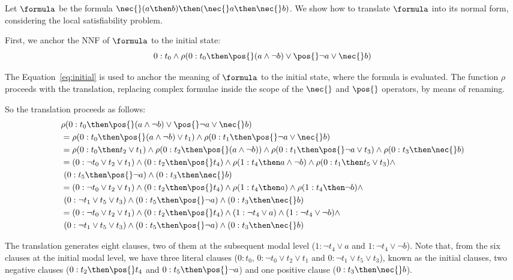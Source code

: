 \begin{example}%
    \label{ex:snf}
    Let $\formula$ be the formula $\nec{}(a \then b) \then (\nec{}a \then \nec{} b)$.
    We show how to translate $\formula$ into its normal form, considering the local
    satisfiability problem.

    First, we anchor the NNF of $\formula$ to the initial state:
    \begin{equation}
        \label{eq:initial}
        0 : t_0 \land \rho(0 : t_0 \then \pos{} (a \land \neg b) \lor \pos{} \neg a \lor \nec{} b)
    \end{equation}

    The Equation~\ref{eq:initial} is used to anchor the meaning of $\formula$ to
    the initial state, where the formula is evaluated. The function $\rho$
    proceeds with the translation, replacing complex formulae inside the
    scope of the $\nec{}$ and $\pos{}$ operators, by means of renaming. 

    So the translation proceeds as follows:
    \begin{align*}
        &\rho(0 : t_0 \then \pos{} (a \land \neg b) \lor \pos{} \neg a \lor \nec{} b) \\
        &= \rho(0: t_0 \then \pos{} (a \land \neg b) \lor t_1) \land \rho(0: t_1 \then \pos{} \neg a \lor \nec{} b) \\
        &= \rho(0: t_0 \then t_2 \lor t_1) \land \rho(0 : t_2 \then \pos {}(a \land \neg b)) \land \rho(0: t_1 \then \pos{} \neg a \lor t_3) \land \rho(0: t_3 \then \nec{} b) \\
        &= (0: \neg t_0 \lor t_2 \lor t_1) \land (0 : t_2 \then \pos {}t_4) \land \rho(1 : t_4 \then a \land \neg b) \land \rho(0: t_1 \then t_5 \lor t_3) \land \\
        &\ (0 : t_5 \then \pos{} \neg a) \land (0: t_3 \then \nec{} b) \\
        &= (0: \neg t_0 \lor t_2 \lor t_1) \land (0 : t_2 \then \pos {}t_4)
        \land \rho(1 : t_4 \then a) \land \rho(1 : t_4 \then \neg b) \land \\ 
        &\ (0: \neg t_1 \lor t_5 \lor t_3) \land (0 : t_5 \then \pos{} \neg a) \land (0: t_3 \then \nec{} b) \\
        &= (0: \neg t_0 \lor t_2 \lor t_1) \land (0 : t_2 \then \pos {}t_4)
        \land (1 : \neg t_4 \lor a) \land (1 : \neg t_4 \lor \neg b) \land \\ 
        &\ (0: \neg t_1 \lor t_5 \lor t_3) \land (0 : t_5 \then \pos{} \neg a) \land (0: t_3 \then \nec{} b) \\
    \end{align*}

    The translation generates eight clauses, two of them at the subsequent modal
    level ($1 : \neg t_4 \lor a$ and $1 : \neg t_4 \lor \neg b$). Note that,
    from the six clauses at the initial modal level, we have three literal
    clauses ($0: t_0$, $0: \neg t_0 \lor t_2 \lor t_1$ and $0: \neg t_1 \lor t_5
    \lor t_3$), known as the initial clauses, two negative clauses ($0 : t_2
    \then \pos {}t_4$ and $0 : t_5 \then \pos{} \neg a$) and one positive clause
    ($0: t_3 \then \nec{} b$).
\end{example}

